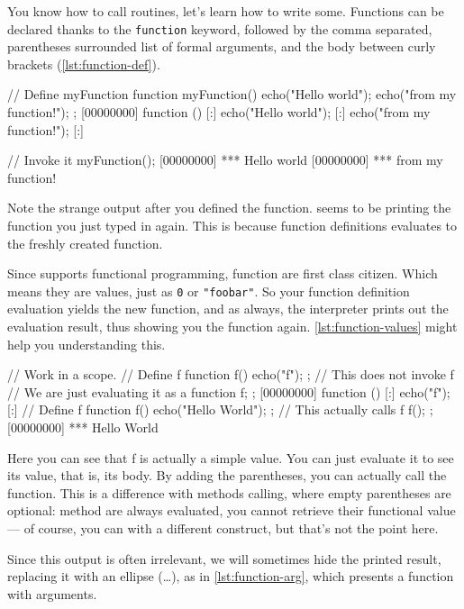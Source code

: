 \documentclass[openright,twoside,12pt]{report}
\begin{document}
You know how to call routines, let's learn how to write
some. Functions can be declared thanks to the \texttt{function}
keyword, followed by the comma separated, parentheses surrounded list
of formal arguments, and the body between curly brackets (\autoref{lst:function-def}).

\begin{urbiscript}[caption=Defining a function,label=lst:function-def]
// Define myFunction
function myFunction()
{
  echo("Hello world");
  echo("from my function!");
};
[00000000] function () {
[:]  echo("Hello world");
[:]  echo("from my function!");
[:]}

// Invoke it
myFunction();
[00000000] *** Hello world
[00000000] *** from my function!
\end{urbiscript}

Note the strange output after you defined the function. \urbi seems to
be printing the function you just typed in again. This is because
function definitions evaluates to the freshly created function.

Since \urbi supports functional programming, function are first class
citizen. Which means they are values, just as \texttt{0} or
\texttt{"foobar"}. So your function definition evaluation yields the
new function, and as always, the interpreter prints out the evaluation
result, thus showing you the function again. \autoref{lst:function-values}
might help you understanding this.


\begin{urbiscript}[caption=Function as values,label=lst:function-values]
// Work in a scope.
{
  // Define f
  function f()
  {
    echo("f");
  };
  // This does not invoke f
  // We are just evaluating it as a function
  f;
};
[00000000] function () {
[:]  echo("f");
[:]}
{
  // Define f
  function f()
  {
    echo("Hello World");
  };
  // This actually calls f
  f();
};
[00000000] *** Hello World
\end{urbiscript}

Here you can see that f is actually a simple value. You can just
evaluate it to see its value, that is, its body. By adding the
parentheses, you can actually call the function. This is a difference
with methods calling, where empty parentheses are optional: method are
always evaluated, you cannot retrieve their functional value --- of
course, you can with a different construct, but that's not the point
here.

Since this output is often irrelevant, we will sometimes hide the
printed result, replacing it with an ellipse (\ldots), as in
\autoref{lst:function-arg}, which presents a function with arguments.
\end{document}
